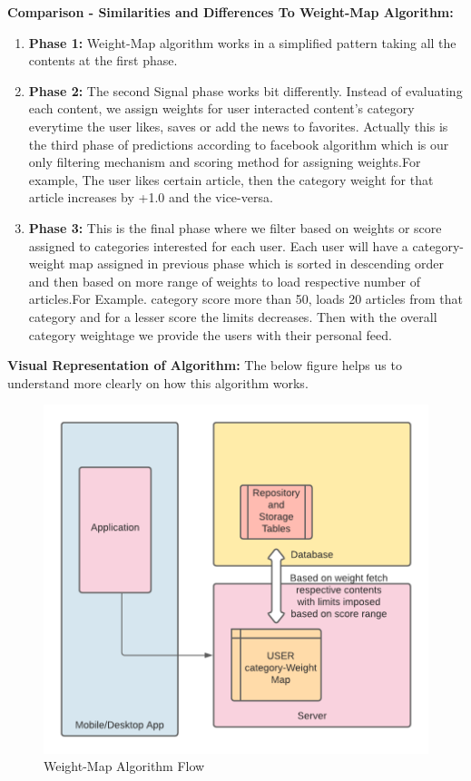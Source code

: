 \textbf{Comparison  - Similarities and Differences To Weight-Map Algorithm: }
\begin{enumerate}
    \item \textbf{ Phase 1: } \newline
 Weight-Map algorithm works in a simplified pattern taking all the contents at the first phase.
     \item \textbf{ Phase 2: } \newline
 The second Signal phase works bit differently. Instead of evaluating each content, we assign weights for user interacted content's category everytime the user likes, saves or add the news to favorites. Actually this is the third phase of predictions according to facebook algorithm which is our only filtering mechanism and scoring method for assigning weights.\newline For example, The user likes certain article, then the category weight for that article increases by +1.0 and the vice-versa.
     \item \textbf{ Phase 3: } \newline
This is the final phase where we filter based on weights or score assigned to categories interested for each user. Each user will have a category-weight map assigned in previous phase which is sorted in descending order and then based on more range of weights to load respective number of articles.\newline  For Example. category score more than 50, loads 20 articles from that category and for a lesser score the limits decreases.
 Then with the overall category weightage we provide the users with their personal feed.

\end{enumerate}
\textbf{Visual Representation of Algorithm:}
The below figure helps us to understand more clearly on how this algorithm works.
 \begin{figure}[h!]
\begin{center}
              \includegraphics[scale=1]{images/WeightMap Algorithm.png}
                 \centering \caption{Weight-Map Algorithm Flow}
\end{center}
\end{figure}
